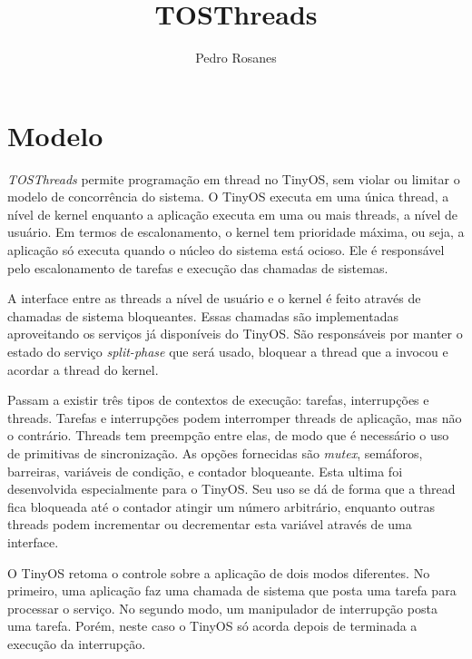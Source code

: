 \documentclass[a4paper,onecolumn, 10pt]{article}
\title{TOSThreads}
\author{Pedro Rosanes}
\begin{document}
\maketitle





\section{Modelo}\label{modelo}
\textit{TOSThreads} permite programação em thread no TinyOS, sem violar ou limitar o modelo de concorrência do
sistema. O TinyOS executa em uma única thread, a nível de kernel enquanto a aplicação executa em uma ou mais threads, a nível de usuário.
Em termos de escalonamento, o kernel tem prioridade máxima, ou seja, a aplicação só executa quando o núcleo do sistema
está ocioso. Ele é responsável pelo escalonamento de tarefas e execução das chamadas de sistemas. 

A interface entre as threads a nível de usuário e o kernel é feito através de chamadas de sistema bloqueantes. Essas
chamadas são implementadas aproveitando os serviços já disponíveis do TinyOS. São responsáveis por manter o estado do serviço 
\textit{split-phase} que será usado, bloquear a thread que a invocou e acordar a thread do kernel.

Passam a existir três tipos de contextos de execução: tarefas, interrupções e threads. Tarefas e interrupções podem
interromper threads de aplicação, mas não o contrário. Threads tem preempção entre elas, de modo que é necessário o uso de primitivas 
de sincronização. As opções fornecidas são \textit{mutex}, semáforos, barreiras, variáveis de condição, e contador
bloqueante. Esta ultima foi desenvolvida especialmente para o TinyOS. Seu uso se dá de forma que a thread fica bloqueada
até o contador atingir um número arbitrário, enquanto outras threads podem incrementar ou decrementar esta variável
através de uma interface.

O TinyOS retoma o controle sobre a aplicação de dois modos diferentes. No primeiro, uma aplicação faz uma chamada de
sistema que posta uma tarefa para processar o serviço. No segundo modo, um manipulador de interrupção posta uma tarefa.
Porém, neste caso o TinyOS só acorda depois de terminada a execução da interrupção.
\end{document}
